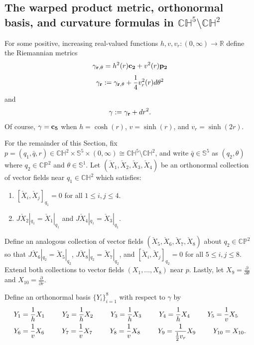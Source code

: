 \documentclass[10pt]{amsart}
\def\R{\mathbb{R}}
\def\S{\mathcal{S}}
\def\g{\gamma}
\def\ddt{\frac{\partial}{\partial \theta}}
\def\ddr{\frac{\partial}{\partial r}}
\def\th{\theta}
\def\H{\mathbb{H}}
\def\C{\mathbb{C}}
\def\S{\mathbb{S}}
\def\P{\mathbb{P}}
\theoremstyle{definition}
\theoremstyle{remark}
\numberwithin{equation}{section}
\begin{document}
\subsection{The warped product metric, orthonormal basis, and curvature formulas in $\C \H^5 \setminus \C \H^2$}
For some positive, increasing real-valued functions $h, v, v_r : (0,\infty) \to \R$ define the Riemannian metrics
	\begin{equation*}
	{\bf \g_{r,\th}} = h^2(r) {\bf c_2} + v^2(r) {\bf p_2}
	\end{equation*}
	\begin{equation*}
	{\bf \g_r} := {\bf \g_{r,\th}} + \frac{1}{4} v_r^2(r) d \th^2    
	\end{equation*}
and
	\begin{equation}\label{eqn:/g}
	{\bf \g} := {\bf \g_r} + dr^2.
	\end{equation}
Of course, ${\bf \g} = {\bf c_5}$ when $h = \cosh(r)$, $v = \sinh(r)$, and $v_r = \sinh(2r)$.

For the remainder of this Section, fix $p = (q_1,\bar{q},r) \in \C \H^2 \times \S^5 \times (0,\infty) \cong \C \H^5 \setminus \C \H^2$, and write $\bar{q} \in \S^5$ as $(q_2, \th)$ where $q_2 \in \C \P^2$ and $\th \in \S^1$.  
Let $(\check{X}_1,\check{X}_2, \check{X}_3, \check{X}_4)$ be an orthonormal collection of vector fields near $q_1 \in \C \H^2$ which satisfies:
	\begin{enumerate}
	 \item  $[\check{X}_i,\check{X}_j]_{q_1} = 0$ for all $1 \leq i, j \leq 4$.
	\item  $J \check{X}_2|_{q_1} = \check{X}_1|_{q_1}$ and $J \check{X}_4|_{q_1} = \check{X}_3|_{q_1}$.
	\end{enumerate}
Define an analogous collection of vector fields $(\check{X}_5, \check{X}_6, \check{X}_7, \check{X}_8)$ about $q_2 \in \C \P^2$ so that $J \check{X}_6|_{q_2} = \check{X}_5|_{q_2}$,  $J \check{X}_8|_{q_2} = \check{X}_7|_{q_2}$, and $[\check{X}_i,\check{X}_j]_{q_2} = 0$ for all $5 \leq i, j \leq 8$.  
Extend both collections to vector fields $(X_1, \hdots, X_8)$ near $p$. 
Lastly, let $X_9 = \ddt$ and $X_{10} = \ddr$.  

Define an orthonormal basis $\{ Y_i \}_{i=1}^8$ with respect to $\g$ by
	\begin{align}
	&Y_1 = \frac{1}{h} X_1	\hskip 25pt	Y_2 = \frac{1}{h} X_2	\hskip 25pt	Y_3 = \frac{1}{h} X_3		\hskip 25pt	Y_4 = \frac{1}{h} X_4  \hskip 25pt  Y_5 = \frac{1}{v} X_5  \label{eqn:orthonormal basis 2}	  \\
	&Y_6 = \frac{1}{v} X_6		\hskip 25pt	Y_7 = \frac{1}{v} X_7		\hskip 25pt	Y_8 = \frac{1}{v} X_8	\hskip 25pt	Y_9 = \frac{1}{\frac{1}{2} v_r} X_9  \hskip 25pt  Y_{10} = X_{10}.  \nonumber
	\end{align}
	
\end{document}
